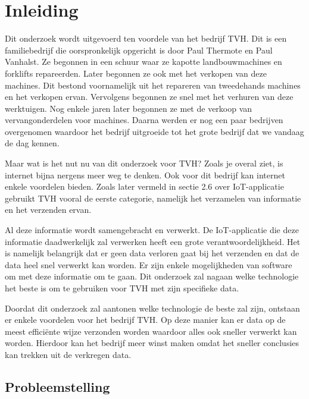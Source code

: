 
\chapter{Inleiding}
\label{ch:inleiding}

Dit onderzoek wordt uitgevoerd ten voordele van het bedrijf TVH. Dit is een familiebedrijf die oorspronkelijk opgericht is door Paul Thermote en Paul Vanhalst. Ze begonnen in een schuur waar ze kapotte landbouwmachines en forklifts repareerden. Later begonnen ze ook met het verkopen van deze machines. Dit bestond voornamelijk uit het repareren van tweedehands machines en het verkopen ervan. Vervolgens begonnen ze snel met het verhuren van deze werktuigen. Nog enkele jaren later begonnen ze met de verkoop van vervangonderdelen voor machines. Daarna werden er nog een paar bedrijven overgenomen waardoor het bedrijf uitgroeide tot het grote bedrijf dat we vandaag de dag kennen. 

Maar wat is het nut nu van dit onderzoek voor TVH? Zoals je overal ziet, is internet bijna nergens meer weg te denken. Ook voor dit bedrijf kan internet enkele voordelen bieden. Zoals later vermeld in sectie 2.6 over IoT-applicatie gebruikt TVH vooral de eerste categorie, namelijk het verzamelen van informatie en het verzenden ervan.

Al deze informatie wordt samengebracht en verwerkt. De IoT-applicatie die deze informatie daadwerkelijk zal verwerken heeft een grote verantwoordelijkheid. Het is namelijk belangrijk dat er geen data verloren gaat bij het verzenden en dat de data heel snel verwerkt kan worden. Er zijn enkele mogelijkheden van software om met deze informatie om te gaan. Dit onderzoek zal nagaan welke technologie het beste is om te gebruiken voor TVH met zijn specifieke data.

Doordat dit onderzoek zal aantonen welke technologie de beste zal zijn, ontstaan er enkele voordelen voor het bedrijf TVH. Op deze manier kan er data op de meest efficiënte wijze verzonden worden waardoor alles ook sneller verwerkt kan worden. Hierdoor kan het bedrijf meer winst maken omdat het sneller conclusies kan trekken uit de verkregen data. 




\section{Probleemstelling}
\label{sec:probleemstelling}

